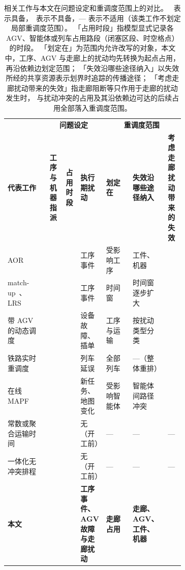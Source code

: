 \documentclass[manuscript,screen,review]{acmart}
\newcommand{\cmark}{\ding{51}}
\newcommand{\xmark}{\ding{55}}
\begin{document}
\begin{table}[t]
\centering
\caption{相关工作与本文在问题设定和重调度范围上的对比。
\cmark\ 表示具备，\xmark\ 表示不具备，— 表示不适用（该类工作不划定局部重调度范围）。
「占用时段」指模型显式记录各 AGV、智能体或列车占用路段（闭塞区段、时空格点）的时段。
「划定在」为范围内允许改写的对象，本文中，工序、AGV 与走廊上的扰动均先转换为起点占用，再沿依赖边划定范围；
「失效沿哪些途径纳入」以失效所经的共享资源表示划界时追踪的传播途径；
「考虑走廊扰动带来的失效」指走廊阻断等只作用于走廊的扰动发生时，
与扰动冲突的占用及其沿依赖边可达的后续占用全部落入重调度范围。}
\label{tab:position}
\small
\setlength{\tabcolsep}{3pt}
\begin{tabular}{@{}p{0.23\linewidth}ccp{0.14\linewidth}p{0.15\linewidth}p{0.17\linewidth}c@{}}
\toprule
& \multicolumn{3}{c}{\textbf{问题设定}} & \multicolumn{3}{c}{\textbf{重调度范围}} \\
\cmidrule(lr){2-4}\cmidrule(l){5-7}
\textbf{代表工作} &
\makecell{\textbf{工序与}\\\textbf{机器指派}} &
\makecell{\textbf{占用}\\\textbf{时段}} &
\textbf{执行期扰动} &
\textbf{划定在} &
\textbf{失效沿哪些途径纳入} &
\makecell{\textbf{考虑走廊扰动}\\\textbf{带来的失效}} \\
\midrule
AOR~\cite{subramaniam2003maor} &
\cmark & \xmark & 工序事件 & 受影响工序 & 工件、机器 & \xmark \\
match-up~\cite{qiao2012single,salido2017rescheduling}、LRS~\cite{kuster2007local} &
\cmark & \xmark & 工序事件 & 时间窗 & 时间窗逐步扩大 & \xmark \\
带 AGV 的动态调度~\cite{zhang2023energy,tang2026dynamic} &
\cmark & \xmark & 设备故障、插单 & 工序与运输 & 按扰动类型分类 & \xmark \\
铁路实时重调度~\cite{mascis2002alternative,dariano2007branch} &
\xmark & \cmark & 列车延误 & 全部列车 & —（整体重排） & \cmark \\
在线 MAPF~\cite{svancara2019online,malka2024online} &
\xmark & \cmark & 新任务、地图变化 & 受影响智能体 & 智能体间路径冲突 & \cmark \\
常数或聚合运输时间~\cite{meng2025cp,qin2026knowledge,jafarian2026integrated} &
\cmark & \xmark & 无（开工前） & — & — & — \\
一体化无冲突排程~\cite{vanos2026exact,sun2023integrated,li2026framework} &
\cmark & \cmark & 无（开工前） & — & — & — \\
\midrule
\textbf{本文} &
\cmark & \cmark & \textbf{工序事件、AGV 故障与走廊扰动} & \textbf{走廊占用} & \textbf{走廊、AGV、工件、机器} & \cmark \\
\bottomrule
\end{tabular}
\end{table}
\end{document}
